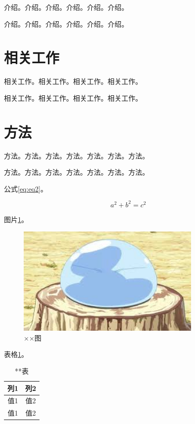 \documentclass{csuthesis}
\begin{document}
    介绍。介绍。介绍。介绍。介绍。介绍。

    介绍。介绍。介绍。介绍。介绍。介绍。

    \section{相关工作}
    相关工作。相关工作。相关工作。相关工作。

    相关工作。相关工作。相关工作。相关工作。

    \section{方法}
    方法。方法。方法。方法。方法。方法。方法。

    方法。方法。方法。方法。方法。方法。方法。

    公式\ref{eq:eq2}。

    \begin{equation}
        a^2 + b^2 = c^2 \label{eq:eq2}
    \end{equation}

    图片\ref{fig:image2}。
    \begin{figure}
        \centering
        \includegraphics[width=0.8\textwidth]{images/image.jpeg}
        \caption{××图}
        \label{fig:image2}
    \end{figure}

    表格\ref{tab:table2}。
    \begin{table}
        \centering
        \caption{**表}
        \label{tab:table2}
        \begin{tabular}{c|c}
            \toprule[1.5bp]
            列1 & 列2 \\
            \midrule[0.75bp]
            值1 & 值2 \\
            值1 & 值2 \\
            \bottomrule[1.5bp]
        \end{tabular}
    \end{table}
\end{document}
